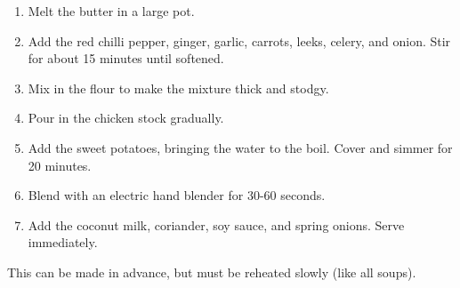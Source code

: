 \documentclass[12pt]{article}%
\newcommand{\blue}[1]{\textcolor{blue!70!white}{#1}}
\begin{document}
\begin{enumerate}
    \item Melt the \blue{butter} in a large pot.
    \item Add the \blue{red chilli pepper}, \blue{ginger}, \blue{garlic}, \blue{carrots}, \blue{leeks}, \blue{celery}, and \blue{onion}. Stir for about 15 minutes until softened.
    \item Mix in the \blue{flour} to make the mixture thick and stodgy.
    \item Pour in the \blue{chicken stock} gradually.
    \item Add the \blue{sweet potatoes}, bringing the water to the boil. Cover and simmer for 20 minutes.
    \item Blend with an electric hand blender for 30-60 seconds.
    \item Add the \blue{coconut milk}, \blue{coriander}, \blue{soy sauce}, and \blue{spring onions}. Serve immediately.
\end{enumerate}

\vspace{\baselineskip} This can be made in advance, but must be reheated slowly (like all soups).
\end{document}
